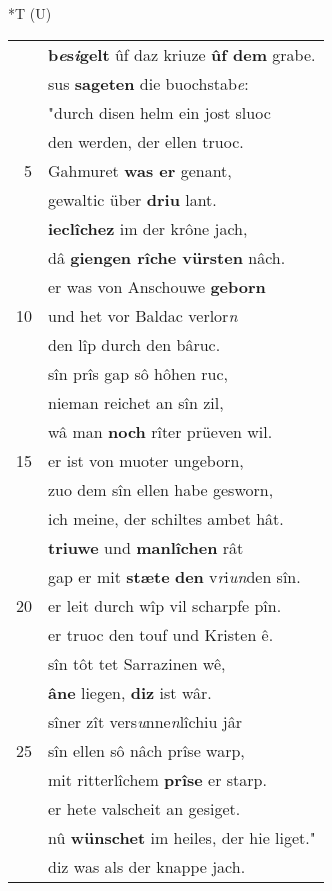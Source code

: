 \documentclass[8pt,a4paper,notitlepage]{article}
\begin{document}
\begin{table}[ht]
\begin{minipage}[t]{0.5\linewidth}
\small
\begin{center}*T (U)
\end{center}
\begin{tabular}{rl}
 & \textbf{b\textit{e}s\textit{i}gelt} ûf daz kriuze \textbf{ûf dem} grabe.\\ 
 & sus \textbf{sageten} die buochstab\textit{e}:\\ 
 & "durch disen helm ein jost sluoc\\ 
 & den werden, der ellen truoc.\\ 
5 & Gahmuret \textbf{was er} genant,\\ 
 & gewaltic über \textbf{driu} lant.\\ 
 & \textbf{ieclîchez} im der krône jach,\\ 
 & dâ \textbf{giengen rîche vürsten} nâch.\\ 
 & er was von Anschouwe \textbf{geborn}\\ 
10 & und het vor Baldac verlor\textit{n}\\ 
 & den lîp durch den bâruc.\\ 
 & sîn prîs gap sô hôhen ruc,\\ 
 & nieman reichet an sîn zil,\\ 
 & wâ man \textbf{noch} rîter prüeven wil.\\ 
15 & er ist von muoter ungeborn,\\ 
 & zuo dem sîn ellen habe gesworn,\\ 
 & ich meine, der schiltes ambet hât.\\ 
 & \textbf{triuwe} und \textbf{manlîchen} rât\\ 
 & gap er mit \textbf{stæte} \textbf{den} v\textit{r}i\textit{un}den sîn.\\ 
20 & er leit durch wîp vil scharpfe pîn.\\ 
 & er truoc den touf und Kristen ê.\\ 
 & sîn tôt tet Sarrazinen wê,\\ 
 & \textbf{âne} liegen, \textbf{diz} ist wâr.\\ 
 & sîner zît vers\textit{u}nne\textit{n}lîchiu jâr\\ 
25 & sîn ellen sô nâch prîse warp,\\ 
 & mit ritterlîchem \textbf{prîse} er starp.\\ 
 & er hete valscheit an gesiget.\\ 
 & nû \textbf{wünschet} im heiles, der hie liget."\\ 
 & diz was als der knappe jach.\\ 

\end{tabular}
\end{minipage}
\end{table}
\end{document}

